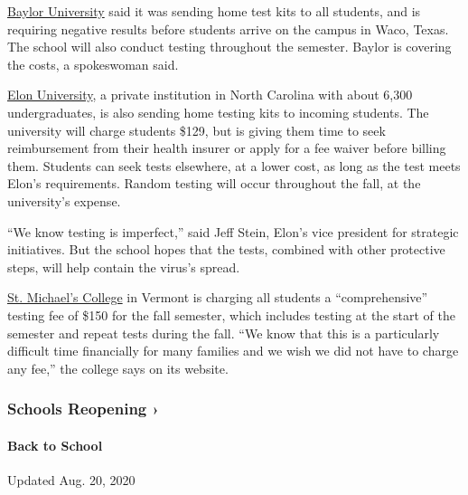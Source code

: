 \href{https://www.baylor.edu/president/news.php?action=story\&story=219855}{Baylor
University} said it was sending home test kits to all students, and is
requiring negative results before students arrive on the campus in Waco,
Texas. The school will also conduct testing throughout the semester.
Baylor is covering the costs, a spokeswoman said.

\href{https://www.elon.edu/u/ready-and-resilient/health-wellness/required-testing-for-covid-19/\#process-and-instructions}{Elon
University}, a private institution in North Carolina with about 6,300
undergraduates, is also sending home testing kits to incoming students.
The university will charge students \$129, but is giving them time to
seek reimbursement from their health insurer or apply for a fee waiver
before billing them. Students can seek tests elsewhere, at a lower cost,
as long as the test meets Elon's requirements. Random testing will occur
throughout the fall, at the university's expense.

``We know testing is imperfect,'' said Jeff Stein, Elon's vice president
for strategic initiatives. But the school hopes that the tests, combined
with other protective steps, will help contain the virus's spread.

\href{https://www.smcvt.edu/return-to-campus/information-for-students/}{St.
Michael's College} in Vermont is charging all students a
``comprehensive'' testing fee of \$150 for the fall semester, which
includes testing at the start of the semester and repeat tests during
the fall. ``We know that this is a particularly difficult time
financially for many families and we wish we did not have to charge any
fee,'' the college says on its website.

\href{https://www.nytimes3xbfgragh.onion/spotlight/schools-reopening?action=click\&pgtype=Article\&state=default\&region=MAIN_CONTENT_3\&context=storylines_keepup}{}

\hypertarget{schools-reopening-}{%
\subsubsection{Schools Reopening ›}\label{schools-reopening-}}

\hypertarget{back-to-school}{%
\paragraph{Back to School}\label{back-to-school}}

Updated Aug. 20, 2020


